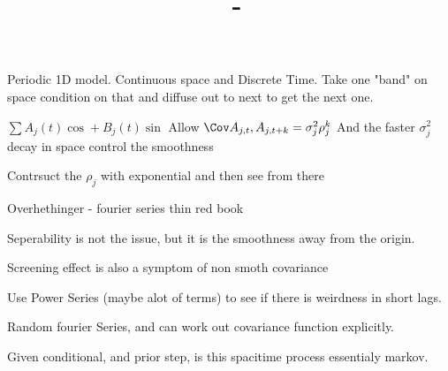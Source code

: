 \documentclass[answers,12pt,addpoints]{exam}
\author{\name}
\title{\course \ - \assignment}
\begin{document}
\maketitle

\newpage
\begin{questions}
\question Periodic 1D model. Continuous space and Discrete Time. Take one "band" on space condition on that and diffuse out to next to get the next one.

\question$\sum A_j(t) \cos + B_j(t) \sin $
Allow $\Cov A_{j,t},A_{j,t+k} = \sigma_j^2 \rho_j^k$ 
And the faster $\sigma^2_j$ decay in space control the smoothness

Contrsuct the $\rho_j$ with exponential and then see from there

Overhethinger - fourier series thin red book

\question Seperability is not the issue, but it is the smoothness away from the origin. 

\question  Screening effect is also a symptom of non smoth covariance 

\question Use Power Series (maybe alot of terms) to see if there is weirdness in short lags. 

\question Random fourier Series, and can work out covariance function explicitly. 

\question Given conditional, and prior step, is this spacitime process essentialy markov.

\end{questions}
\end{document}
